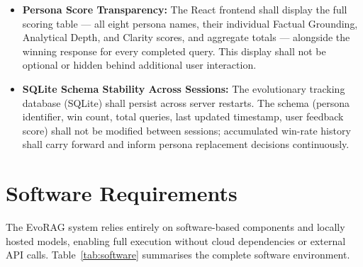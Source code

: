 \begin{itemize}
    \item \textbf{Persona Score Transparency:}
    The React frontend shall display the full scoring table — all eight persona names,
    their individual Factual Grounding, Analytical Depth, and Clarity scores, and
    aggregate totals — alongside the winning response for every completed query.
    This display shall not be optional or hidden behind additional user interaction.

    \item \textbf{SQLite Schema Stability Across Sessions:}
    The evolutionary tracking database (SQLite) shall persist across server restarts.
    The schema (persona identifier, win count, total queries, last updated timestamp,
    user feedback score) shall not be modified between sessions; accumulated win-rate
    history shall carry forward and inform persona replacement decisions continuously.

\end{itemize}

\section{Software Requirements}

The EvoRAG system relies entirely on software-based components and locally hosted
models, enabling full execution without cloud dependencies or external API calls.
Table~\ref{tab:software} summarises the complete software environment.

\vspace{0.5em}

